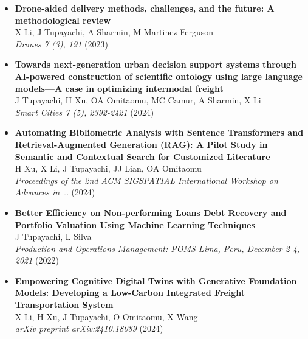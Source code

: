 \documentclass[10pt, letterpaper]{article}
\begin{document}
    \begin{itemize}[left=0pt] %
        \item \textbf{Drone-aided delivery methods, challenges, and the future: A methodological review} \\
        X Li, J Tupayachi, A Sharmin, M Martinez Ferguson \\
        \textit{Drones 7 (3), 191} (2023) \\
    
        \item \textbf{Towards next-generation urban decision support systems through AI-powered construction of scientific ontology using large language models—A case in optimizing intermodal freight} \\
        J Tupayachi, H Xu, OA Omitaomu, MC Camur, A Sharmin, X Li \\
        \textit{Smart Cities 7 (5), 2392-2421} (2024) \\
    
        \item \textbf{Automating Bibliometric Analysis with Sentence Transformers and Retrieval-Augmented Generation (RAG): A Pilot Study in Semantic and Contextual Search for Customized Literature} \\
        H Xu, X Li, J Tupayachi, JJ Lian, OA Omitaomu \\
        \textit{Proceedings of the 2nd ACM SIGSPATIAL International Workshop on Advances in …} (2024) \\
    
        \item \textbf{Better Efficiency on Non-performing Loans Debt Recovery and Portfolio Valuation Using Machine Learning Techniques} \\
        J Tupayachi, L Silva \\
        \textit{Production and Operations Management: POMS Lima, Peru, December 2-4, 2021} (2022) \\
    
        \item \textbf{Empowering Cognitive Digital Twins with Generative Foundation Models: Developing a Low-Carbon Integrated Freight Transportation System} \\
        X Li, H Xu, J Tupayachi, O Omitaomu, X Wang \\
        \textit{arXiv preprint arXiv:2410.18089} (2024) \\
    

\end{itemize}
\end{document}

